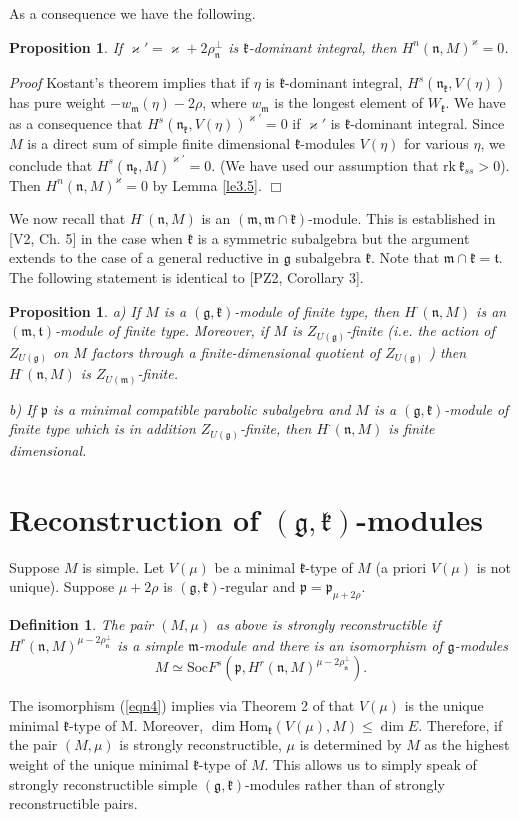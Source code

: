 \documentclass[11pt]{amsart}
\newcounter{theorem}
\newtheorem{prop}[theo]{Proposition}
\renewenvironment{proof}{ \emph{Proof}}{$\Box$}
\newtheorem{defi}{Definition}[section]
\renewcommand{\tt}{\mathfrak{t}}
\newcommand{\kk}{\mathfrak{k}}
\newcommand{\nn}{\mathfrak{n}}
\newcommand{\mm}{\mathfrak{m}}
\newcommand{\pp}{\mathfrak{p}}
\renewcommand{\gg}{\mathfrak{g}}
\newcommand{\refle}[1]{Lemma \ref{#1}}
\newcommand{\refeq}[1]{(\ref{#1})}
\newcommand{\Soc}{\mathrm{Soc}}
\newcommand{\Hom}{\mathrm{Hom}}
\newcommand{\rk}{\mathrm{rk~}}
\begin{document}
As a consequence we have the following.
\begin{prop}
If $\varkappa '=\varkappa+2\rho_\nn^\perp$ is $\kk$-dominant integral, then $H^n(\nn,M)^\varkappa=0$.
\end{prop}
\begin{proof}
Kostant's theorem \cite{Ko} implies that if $\eta$ is $\kk$-dominant integral, $H^s(\nn_\kk,V(\eta))$ has pure weight $-w_\mm(\eta)-2\rho$, where $w_\mm$ is the longest element of $W_\kk$. We have as a consequence that $H^s(\nn_\kk,V(\eta))^{\varkappa'}=0$ if $\varkappa'$ is $\kk$-dominant integral. Since $M$ is a direct sum of simple finite dimensional $\kk$-modules $V(\eta)$ for various $\eta$, we conclude that $H^s(\nn_\kk,M)^{\varkappa'}=0$. (We have used our assumption that $\rk \kk_{ss}>0$). Then $H^n(\nn,M)^\varkappa=0$ by \refle{le3.5}.
\end{proof}

We now recall that $H^\cdot(\nn,M)$ is an $(\mm,\mm\cap\kk)$-module. This is established in [V2, Ch. 5] in the case when $\kk$ is a symmetric subalgebra but the argument extends to the case of a general reductive in $\gg$ subalgebra $\kk$. Note that $\mm\cap\kk=\tt$. The following statement is identical to [PZ2, Corollary 3].
\begin{prop}\label{pr3.5}
a) If $M$ is a $(\gg,\kk)$-module of finite type, then $H^\cdot(\nn,M)$ is an $(\mm,\tt)$-module of finite type. Moreover, if $M$ is $Z_{U(\gg)}$-finite (i.e. the action of $Z_{U(\gg)}$ on $M$ factors through a finite-dimensional quotient of  $Z_{U(\gg)}$ ) then $H^\cdot(\nn,M)$ is  $Z_{U(\mm)}$-finite.

b) If $\pp$ is a minimal compatible parabolic subalgebra and $M$ is a $(\gg,\kk)$-module of finite type which is in addition  $Z_{U(\gg)}$-finite, then $H^\cdot(\nn,M)$ is finite dimensional.
\end{prop}

\section{Reconstruction of $(\gg,\kk)$-modules}

Suppose $M$ is simple. Let $V(\mu)$ be a minimal $\kk$-type of $M$ (a priori $V(\mu)$ is not unique). Suppose $\mu+2\rho$ is $(\gg,\kk)$-regular and $\pp=\pp_{\mu+2\rho}$.
\begin{defi}
The pair $(M,\mu)$ as above is \emph{strongly reconstructible} if $H^r(\nn,M)^{\mu-2\rho_\nn^\perp}$ is a simple $\mm$-module and there is an isomorphism of $\gg$-modules
\begin{equation}\label{eqn4}
M\simeq\Soc F^s(\pp,H^r(\nn,M)^{\mu-2\rho_\nn^\perp}).
\end{equation}
\end{defi}
The isomorphism \refeq{eqn4} implies via Theorem 2 of \cite{PZ3} that $V(\mu)$ is the unique minimal $\kk$-type of M. Moreover, $\dim\Hom_\kk(V(\mu),M)\leq\dim E$. Therefore, if the pair $(M,\mu)$ is strongly reconstructible, $\mu$ is determined by $M$ as the highest weight of the unique minimal $\kk$-type of $M$. This allows us to simply speak of strongly reconstructible simple $(\gg,\kk)$-modules rather than of strongly reconstructible pairs.
\end{document}
